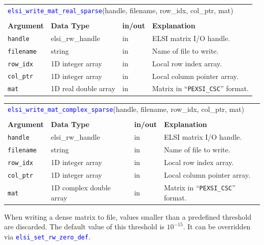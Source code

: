 \documentclass{report}
\newcommand{\api}[1]{\textcolor{blue}{\texttt{#1}}}
\begin{document}
\begin{tabular}[]{|p{20mm}|p{40mm}|p{10mm}|p{92mm}|}
\multicolumn{4}{l}{\api{elsi\_write\_mat\_real\_sparse}(handle, filename, row\_idx, col\_ptr, mat)}\\
\multicolumn{4}{l}{}\\
\hline
\multicolumn{1}{|l|}{\textbf{Argument}} & \multicolumn{1}{l|}{\textbf{Data Type}} & \multicolumn{1}{l|}{\textbf{in/out}} & \multicolumn{1}{l|}{\textbf{Explanation}}\\
\hline
\texttt{handle}   & elsi\_rw\_handle     & in & ELSI matrix I/O handle.\\
\hline
\texttt{filename} & string               & in & Name of file to write.\\
\hline
\texttt{row\_idx} & 1D integer array     & in & Local row index array.\\
\hline
\texttt{col\_ptr} & 1D integer array     & in & Local column pointer array.\\
\hline
\texttt{mat}      & 1D real double array & in & Matrix in ``\texttt{PEXSI\_CSC}'' format.\\
\hline
\end{tabular}

\begin{tabular}[]{|p{20mm}|p{40mm}|p{10mm}|p{92mm}|}
\multicolumn{4}{l}{\api{elsi\_write\_mat\_complex\_sparse}(handle, filename, row\_idx, col\_ptr, mat)}\\
\multicolumn{4}{l}{}\\
\hline
\multicolumn{1}{|l|}{\textbf{Argument}} & \multicolumn{1}{l|}{\textbf{Data Type}} & \multicolumn{1}{l|}{\textbf{in/out}} & \multicolumn{1}{l|}{\textbf{Explanation}}\\
\hline
\texttt{handle}   & elsi\_rw\_handle        & in & ELSI matrix I/O handle.\\
\hline
\texttt{filename} & string                  & in & Name of file to write.\\
\hline
\texttt{row\_idx} & 1D integer array        & in & Local row index array.\\
\hline
\texttt{col\_ptr} & 1D integer array        & in & Local column pointer array.\\
\hline
\texttt{mat}      & 1D complex double array & in & Matrix in ``\texttt{PEXSI\_CSC}'' format.\\
\hline
\end{tabular}

When writing a dense matrix to file, values smaller than a predefined threshold are discarded. The default value of this threshold is $10^{-15}$. It can be overridden via \api{elsi\_set\_rw\_zero\_def}.
\end{document}
